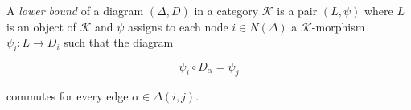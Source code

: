 A \emph{lower bound} of a diagram $(\Delta, D)$ in a category $\mathcal{K}$ is a pair $(L, \psi)$ where $L$ is an object of $\mathcal{K}$ and $\psi$ assigns to each node $i \in N(\Delta)$ a $\mathcal{K}$-morphism $\psi_i: L \longrightarrow D_i$ such that the diagram

$$\psi_i \circ D_\alpha = \psi_j$$

commutes for every edge $\alpha \in \Delta(i, j)$.
